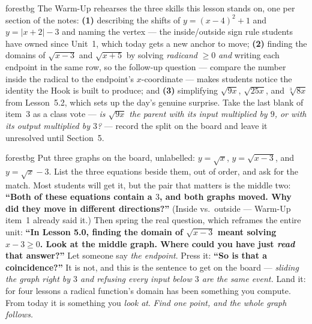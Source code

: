 \documentclass[10pt]{article}
\begin{document}
\begin{fixedskillbox}{forestbg}
    The Warm-Up rehearses the three skills this lesson stands on, one per section of the notes:
    \textbf{(1)} describing the shifts of $y=(x-4)^2+1$ and $y=|x+2|-3$ and naming the vertex --- the
    inside/outside sign rule students have owned since Unit~1, which today gets a new anchor to move;
    \textbf{(2)} finding the domains of $\sqrt{x-3}$ and $\sqrt{x+5}$ by solving \emph{radicand}
    $\ge0$ \emph{and} writing each endpoint in the same row, so the follow-up question --- compare the
    number inside the radical to the endpoint's $x$-coordinate --- makes students notice the identity
    the Hook is built to produce; and \textbf{(3)} simplifying $\sqrt{9x}$, $\sqrt{25x}$, and
    $\sqrt[3]{8x}$ from Lesson~5.2, which sets up the day's genuine surprise. Take the last blank of
    item~3 as a class vote --- \emph{is $\sqrt{9x}$ the parent with its input multiplied by $9$, or
    with its output multiplied by $3$?} --- record the split on the board and leave it unresolved
    until Section~5.
\end{fixedskillbox}

\begin{skillbox}[Hook]{forestbg}
    Put three graphs on the board, unlabelled: $y=\sqrt{x}$, $y=\sqrt{x-3}$, and $y=\sqrt{x}-3$. List
    the three equations beside them, out of order, and ask for the match. Most students will get it,
    but the pair that matters is the middle two: \textbf{``Both of these equations contain a $3$, and
    both graphs moved. Why did they move in different directions?''} (Inside vs.\ outside --- Warm-Up
    item~1 already said it.) Then spring the real question, which reframes the entire unit:
    \textbf{``In Lesson 5.0, finding the domain of $\sqrt{x-3}$ meant solving $x-3\ge0$. Look at the
    middle graph. Where could you have just \emph{read} that answer?''} Let someone say \emph{the
    endpoint}. Press it: \textbf{``So is that a coincidence?''} It is not, and this is the sentence to
    get on the board --- \emph{sliding the graph right by $3$ and refusing every input below $3$ are
    the same event.} Land it: for four lessons a radical function's domain has been something you
    compute. From today it is something you \emph{look at}. \emph{Find one point, and the whole graph
    follows.}
\end{skillbox}
\end{document}
